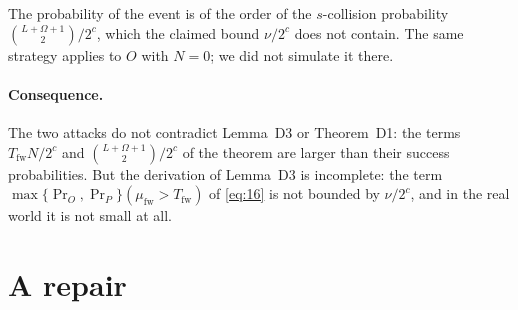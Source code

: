 \documentclass[11pt,a4paper]{article}
\theoremstyle{definition}
\theoremstyle{remark}
\newcommand{\mufw}{\mu_{\mathrm{fw}}}
\newcommand{\Tfw}{T_{\mathrm{fw}}}
\begin{document}
The probability of the event is of the order of the $s$-collision probability $\binom{L+\Omega+1}{2}/2^c$, which the
claimed bound $\nu/2^c$ does not contain. The same strategy applies to $O$ with $N = 0$; we did not simulate it there.

\paragraph{Consequence.} The two attacks do not contradict Lemma~D3 or Theorem~D1: the terms
$\Tfw N/2^c$ and $\binom{L+\Omega+1}{2}/2^c$ of the theorem are larger than their success probabilities. But the
derivation of Lemma~D3 is incomplete: the term $\max\{\Pr_O, \Pr_P\}(\mufw > \Tfw)$ of \eqref{eq:16} is not bounded by
$\nu/2^c$, and in the real world it is not small at all.

\section{A repair}\label{sec:repair}
\end{document}
